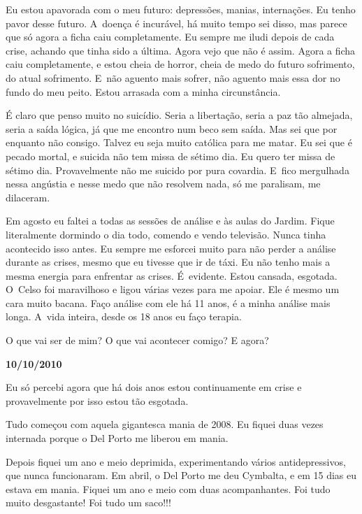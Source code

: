 Eu estou apavorada com o meu futuro: depressões, manias, internações. Eu
tenho pavor desse futuro. A~doença é incurável, há muito tempo sei
disso, mas parece que só agora a ficha caiu completamente. Eu sempre me
iludi depois de cada crise, achando que tinha sido a última. Agora vejo
que não é assim. Agora a ficha caiu completamente, e estou cheia de
horror, cheia de medo do futuro sofrimento, do atual sofrimento. E~não
aguento mais sofrer, não aguento mais essa dor no fundo do meu peito.
Estou arrasada com a minha circunstância.

É claro que penso muito no suicídio. Seria a libertação, seria a paz tão
almejada, seria a saída lógica, já que me encontro num beco sem saída.
Mas sei que por enquanto não consigo. Talvez eu seja muito católica para
me matar. Eu sei que é pecado mortal, e suicida não tem missa de sétimo
dia. Eu quero ter missa de sétimo dia. Provavelmente não me suicido por
pura covardia. E~fico mergulhada nessa angústia e nesse medo que não
resolvem nada, só me paralisam, me dilaceram.

Em agosto eu faltei a todas as sessões de análise e às aulas do Jardim.
Fique literalmente dormindo o dia todo, comendo e vendo televisão. Nunca
tinha acontecido isso antes. Eu sempre me esforcei muito para não perder
a análise durante as crises, mesmo que eu tivesse que ir de táxi. Eu não
tenho mais a mesma energia para enfrentar as crises. É~evidente. Estou
cansada, esgotada. O~Celso foi maravilhoso e ligou várias vezes para me
apoiar. Ele é mesmo um cara muito bacana. Faço análise com ele há 11
anos, é a minha análise mais longa. A~vida inteira, desde os 18 anos eu
faço terapia.

O que vai ser de mim? O que vai acontecer comigo? E agora?

\begin{flushright}\textbf{10/10/2010}\end{flushright}


Eu só percebi agora que há dois anos estou continuamente em crise e
provavelmente por isso estou tão esgotada.

Tudo começou com aquela gigantesca mania de 2008. Eu fiquei duas vezes
internada porque o Del Porto me liberou em mania.

Depois fiquei um ano e meio deprimida, experimentando vários
antidepressivos, que nunca funcionaram. Em abril, o Del Porto me deu
Cymbalta, e em 15 dias eu estava em mania. Fiquei um ano e meio com duas
acompanhantes. Foi tudo muito desgastante! Foi tudo um saco!!!

